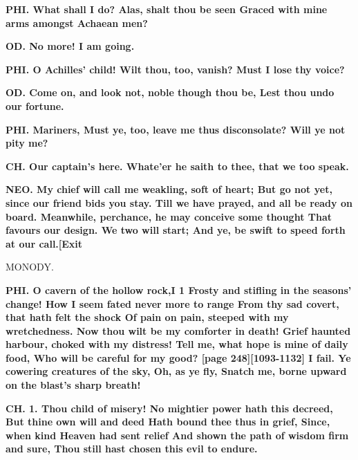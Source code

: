 \documentclass[11pt,letter]{book}
\begin{document}
\par \textbf{PHI. What shall I do? Alas, shalt thou be seen Graced with mine arms amongst Achaean men?}
\par 

\par \textbf{OD. No more! I am going.}
\par 

\par \textbf{PHI. O Achilles’ child! Wilt thou, too, vanish? Must I lose thy voice?}
\par 

\par \textbf{OD. Come on, and look not, noble though thou be, Lest thou undo our fortune.}
\par 

\par \textbf{PHI. Mariners, Must ye, too, leave me thus disconsolate? Will ye not pity me?}
\par 

\par \textbf{CH. Our captain’s here. Whate’er he saith to thee, that we too speak.}
\par 

\par \textbf{NEO. My chief will call me weakling, soft of heart; But go not yet, since our friend bids you stay. Till we have prayed, and all be ready on board. Meanwhile, perchance, he may conceive some thought That favours our design. We two will start; And ye, be swift to speed forth at our call.[Exit}
\par 

\par  MONODY.

\par \textbf{PHI. O cavern of the hollow rock,I 1 Frosty and stifling in the seasons’ change! How I seem fated never more to range From thy sad covert, that hath felt the shock Of pain on pain, steeped with my wretchedness. Now thou wilt be my comforter in death! Grief haunted harbour, choked with my distress! Tell me, what hope is mine of daily food, Who will be careful for my good? [page 248][1093-1132] I fail. Ye cowering creatures of the sky, Oh, as ye fly, Snatch me, borne upward on the blast’s sharp breath!}
\par 

\par \textbf{CH. 1. Thou child of misery! No mightier power hath this decreed, But thine own will and deed Hath bound thee thus in grief, Since, when kind Heaven had sent relief And shown the path of wisdom firm and sure, Thou still hast chosen this evil to endure.}
\par 
\end{document}
